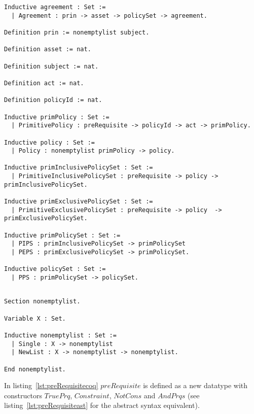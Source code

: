 \lstset{language=Coq}
\begin{minipage}[c]{0.95\textwidth}
\begin{lstlisting}[frame=single, caption={ACPL: Coq Version of Agreement},label={lst:agreementcoqACPL}]
Inductive agreement : Set :=
  | Agreement : prin -> asset -> policySet -> agreement.

Definition prin := nonemptylist subject.

Definition asset := nat.

Definition subject := nat.

Definition act := nat.

Definition policyId := nat.

Inductive primPolicy : Set :=
  | PrimitivePolicy : preRequisite -> policyId -> act -> primPolicy.

Inductive policy : Set :=
  | Policy : nonemptylist primPolicy -> policy.

Inductive primInclusivePolicySet : Set :=
  | PrimitiveInclusivePolicySet : preRequisite -> policy -> primInclusivePolicySet.

Inductive primExclusivePolicySet : Set :=
  | PrimitiveExclusivePolicySet : preRequisite -> policy  -> primExclusivePolicySet.

Inductive primPolicySet : Set :=
  | PIPS : primInclusivePolicySet -> primPolicySet
  | PEPS : primExclusivePolicySet -> primPolicySet.

Inductive policySet : Set :=
  | PPS : primPolicySet -> policySet.

\end{lstlisting}
\end{minipage}


\begin{minipage}[c]{0.95\textwidth}
\begin{lstlisting}

Section nonemptylist.

Variable X : Set.

Inductive nonemptylist : Set :=
  | Single : X -> nonemptylist 
  | NewList : X -> nonemptylist -> nonemptylist.

End nonemptylist.
\end{lstlisting}
\end{minipage}


In listing~\ref{lst:preRequisitecoq} $preRequisite$ is defined as a new datatype with constructors $TruePrq$, $Constraint$, $NotCons$ and $AndPrqs$ (see listing~\ref{lst:preRequisiteast} for the abstract syntax equivalent).

